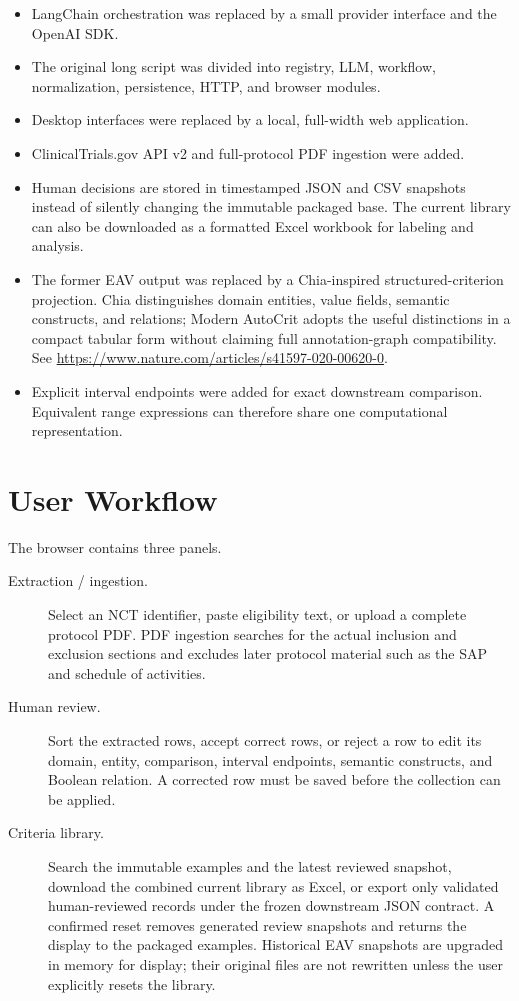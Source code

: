 \documentclass[11pt]{article}
\begin{document}
\begin{itemize}
  \item LangChain orchestration was replaced by a small provider interface and the OpenAI SDK.
  \item The original long script was divided into registry, LLM, workflow, normalization, persistence, HTTP, and browser modules.
  \item Desktop interfaces were replaced by a local, full-width web application.
  \item ClinicalTrials.gov API v2 and full-protocol PDF ingestion were added.
  \item Human decisions are stored in timestamped JSON and CSV snapshots instead of silently changing the immutable packaged base. The current library can also be downloaded as a formatted Excel workbook for labeling and analysis.
  \item The former EAV output was replaced by a Chia-inspired structured-criterion projection. Chia distinguishes domain entities, value fields, semantic constructs, and relations; Modern AutoCrit adopts the useful distinctions in a compact tabular form without claiming full annotation-graph compatibility. See \url{https://www.nature.com/articles/s41597-020-00620-0}.
  \item Explicit interval endpoints were added for exact downstream comparison. Equivalent range expressions can therefore share one computational representation.
\end{itemize}

\section{User Workflow}

The browser contains three panels.

\begin{description}
  \item[Extraction / ingestion.] Select an NCT identifier, paste eligibility text, or upload a complete protocol PDF. PDF ingestion searches for the actual inclusion and exclusion sections and excludes later protocol material such as the SAP and schedule of activities.
  \item[Human review.] Sort the extracted rows, accept correct rows, or reject a row to edit its domain, entity, comparison, interval endpoints, semantic constructs, and Boolean relation. A corrected row must be saved before the collection can be applied.
  \item[Criteria library.] Search the immutable examples and the latest reviewed snapshot, download the combined current library as Excel, or export only validated human-reviewed records under the frozen downstream JSON contract. A confirmed reset removes generated review snapshots and returns the display to the packaged examples. Historical EAV snapshots are upgraded in memory for display; their original files are not rewritten unless the user explicitly resets the library.
\end{description}
\end{document}
